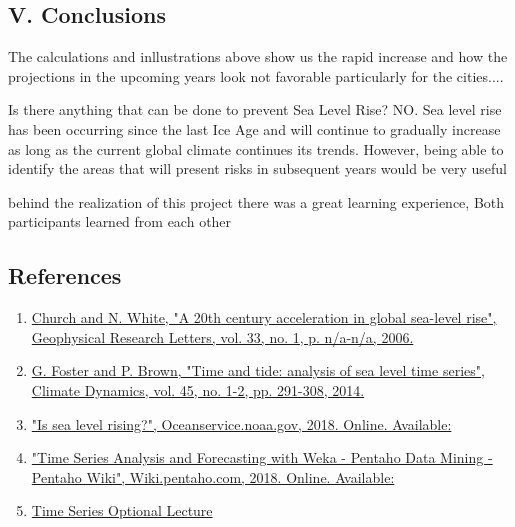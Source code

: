 \documentclass[11pt]{article}
\begin{document}
    \subsection{V. Conclusions}\label{v.-conclusions}

The calculations and inllustrations above show us the rapid increase and
how the projections in the upcoming years look not favorable
particularly for the cities....

Is there anything that can be done to prevent Sea Level Rise? NO. Sea
level rise has been occurring since the last Ice Age and will continue
to gradually increase as long as the current global climate continues
its trends. However, being able to identify the areas that will present
risks in subsequent years would be very useful

behind the realization of this project there was a great learning
experience, Both participants learned from each other

    \subsection{References}\label{references}

    \begin{enumerate}
\def\labelenumi{\arabic{enumi}.}
\item
  \href{https://agupubs.onlinelibrary.wiley.com/doi/full/10.1029/2005GL024826}{Church
  and N. White, "A 20th century acceleration in global sea-level rise",
  Geophysical Research Letters, vol. 33, no. 1, p. n/a-n/a, 2006.}
\item
  \href{https://www.researchgate.net/publication/265467321_Time_and_tide_analysis_of_sea_level_time_series}{G.
  Foster and P. Brown, "Time and tide: analysis of sea level time
  series", Climate Dynamics, vol. 45, no. 1-2, pp. 291-308, 2014.}
\item
  \href{https://oceanservice.noaa.gov/facts/sealevel.html}{"Is sea level
  rising?", Oceanservice.noaa.gov, 2018. Online. Available:}
\item
  \href{https://wiki.pentaho.com/display/DATAMINING/Time+Series+Analysis+and+Forecasting+with+Weka\#TimeSeriesAnalysisandForecastingwithWeka-1Introduction}{"Time
  Series Analysis and Forecasting with Weka - Pentaho Data Mining -
  Pentaho Wiki", Wiki.pentaho.com, 2018. Online. Available:}
\item
  \href{https://www.youtube.com/watch?v=ks6S2LnFWo8\&feature=youtu.be}{Time
  Series Optional Lecture}
\end{enumerate}
\end{document}
